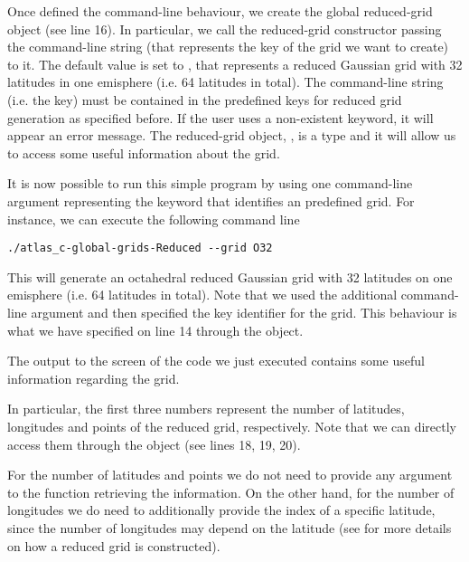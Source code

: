 %

%
Once defined the command-line behaviour, we create the global 
reduced-grid object (see line 16). In particular, we call the 
reduced-grid constructor passing the command-line string (that 
represents the key of the grid we want to create) to it.
The default value is set to , that represents 
a reduced Gaussian grid with 32 latitudes in one emisphere 
(i.e. 64 latitudes in total).  
The command-line string (i.e. the key) must be contained 
in the predefined keys for reduced grid generation as specified 
before. If the user uses a non-existent keyword, it will 
appear an error message.
The reduced-grid object, , is 
a  type and it will allow 
us to access some useful information about the grid.  

It is now possible to run this simple program by using one 
command-line argument representing the keyword that identifies 
an \Atlas predefined grid. For instance, we can execute the 
following command line
%
\begin{lstlisting}[style=BashStyle]
./atlas_c-global-grids-Reduced --grid O32
\end{lstlisting}
% 
This will generate an octahedral reduced Gaussian grid with 
32 latitudes on one emisphere (i.e. 64 latitudes in total).
Note that we used the additional command-line argument 
 and then specified the key identifier 
for the grid. This behaviour is what we have specified 
on line 14 through the  object.

The output to the screen of the code we just executed 
contains some useful information regarding the grid. 

In particular, the first three numbers represent the 
number of latitudes, longitudes and points of the reduced
grid, respectively. Note that we can directly access them 
through the  object (see lines 18, 19, 20).
\begin{tipbox}
For the number of latitudes and points we do not need to provide
any argument to the function retrieving the information. On the 
other hand, for the number of longitudes we do need to additionally 
provide the index of a specific latitude, since the number of 
longitudes may depend on the latitude (see  
for more details on how a reduced grid is constructed). 
\end{tipbox}

